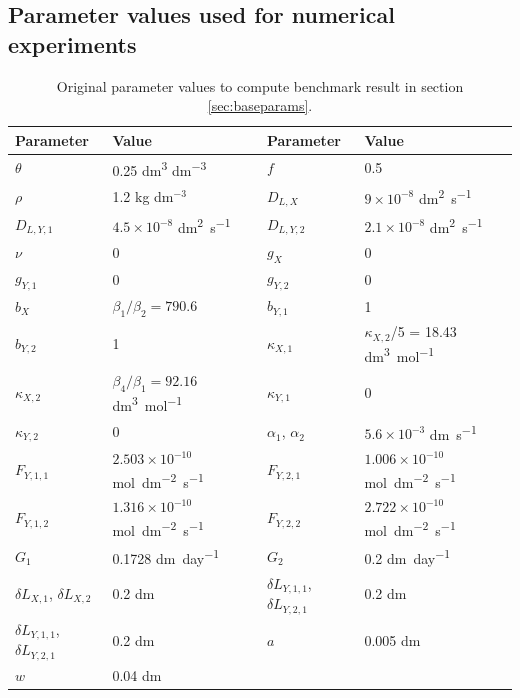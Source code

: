 \documentclass[11pt]{article}
\numberwithin{equation}{section}
\begin{document}
\subsection{Parameter values used for numerical experiments}
\label{app:parametertable}
\begin{table}[h]
\begin{center}

\fontsize{9.5}{7}\selectfont
\setlength{\tabcolsep}{5.pt}
\def\arraystretch{2.0}
\begin{tabular}{ll|ll}
\toprule
  \textbf{Parameter} & \textbf{Value} & \textbf{Parameter} & \textbf{Value}  \\
 \hline 
$\theta$ & 0.25 \si{dm^3} \si{dm^{-3}} & $f$ & 0.5 \\
$\rho$ & 1.2 kg dm$^{-3}$ & $D_{L,X}$ & $9 \times 10^{-8}$ \si{dm^2.s^{-1}} \\
$D_{L,Y,1}$  & $4.5 \times 10^{-8}$ \si{dm^2 . s^{-1}} & $D_{L,Y,2}$ & $2.1 \times 10^{-8}$ \si{dm^2 .s^{-1}} \\
$\nu$ & 0 & $g_X$ & 0 \\
$g_{Y,1}$ & 0 & $g_{Y,2}$ & 0 \\
$b_X$ & $\beta_1 / \beta_2 = 790.6$ & $b_{Y,1}$ & 1 \\
$b_{Y,2}$ & 1 & $\kappa_{X,1}$ & $\kappa_{X,2}$/5 = 18.43 \si{dm^3 . mol^{-1}} \\
$\kappa_{X,2}$ & $\beta_4 / \beta_1 = 92.16$ \si{dm^3 .mol^{-1}} & $\kappa_{Y,1}$ & 0 \\
$\kappa_{Y,2}$ & 0 & $\alpha_1$, $\alpha_2$ & $5.6 \times 10^{-3}$ \si{dm.s^{-1}}\\
$F_{Y,1,1}$ & $2.503 \times 10^{-10}$ \si{mol.dm^{-2}.s^{-1}} & $F_{Y,2,1}$ & $1.006 \times 10^{-10}$ \si{mol.dm^{-2}.s^{-1}} \\
$F_{Y,1,2}$ & $1.316 \times 10^{-10}$ \si{mol.dm^{-2}.s^{-1}} & $F_{Y,2,2}$ & $2.722 \times 10^{-10}$ \si{mol.dm^{-2}.s^{-1}}\\
$G_1$ & 0.1728 \si{dm.day^{-1}} & $G_2$ & 0.2 \si{dm.day^{-1}} \\
$\delta L_{X,1}$, $\delta L_{X,2}$ & 0.2 \si{dm} & $\delta L_{Y,1,1}$, $\delta L_{Y,2,1}$ & 0.2 \si{dm} \\
$\delta L_{Y,1,1}$, $\delta L_{Y,2,1}$ & 0.2 \si{dm} & $a$ & 0.005 \si{dm} \\
$w$ & 0.04 \si{dm} & & \\
\bottomrule
\end{tabular}
\caption{Original parameter values to compute benchmark result in section \ref{sec:baseparams}. \label{t:baseparams}}

\end{center}
\end{table}
\end{document}
